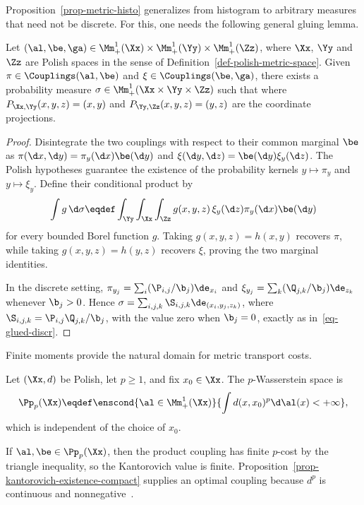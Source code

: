 Proposition~\ref{prop-metric-histo} generalizes from histogram to arbitrary measures that need not be discrete. For this, one needs the following general gluing lemma.

\begin{lem}\label{lem-gluing-general}
		Let $(\al,\be,\ga) \in \Mm_+^1(\Xx) \times \Mm_+^1(\Yy) \times \Mm_+^1(\Zz)$, where $\Xx$, $\Yy$ and $\Zz$ are Polish spaces in the sense of Definition~\ref{def-polish-metric-space}.
		Given $\pi \in \Couplings(\al,\be)$ and $\xi \in \Couplings(\be,\ga)$, there exists a probability measure
		$\sigma \in \Mm_+^1(\Xx \times \Yy \times \Zz)$ such that
		where $P_{\Xx,\Yy}(x,y,z)=(x,y)$ and $P_{\Yy,\Zz}(x,y,z)=(y,z)$ are the coordinate projections.
\end{lem}
\begin{proof}
		Disintegrate the two couplings with respect to their common marginal $\be$ as
		$\pi(\d x,\d y)=\pi_y(\d x)\be(\d y)$ and
		$\xi(\d y,\d z)=\be(\d y)\xi_y(\d z)$.
		The Polish hypotheses guarantee the existence of the probability kernels $y\mapsto\pi_y$ and $y\mapsto\xi_y$. Define their conditional product by
		\[
			\int g\,\d\sigma
			\eqdef
			\int_\Yy\int_\Xx\int_\Zz
			g(x,y,z)\,\xi_y(\d z)\pi_y(\d x)\be(\d y)
		\]
		for every bounded Borel function $g$. Taking $g(x,y,z)=h(x,y)$ recovers $\pi$, while taking $g(x,y,z)=h(y,z)$ recovers $\xi$, proving the two marginal identities.

		In the discrete setting, $\pi_{y_j}=\sum_i(\P_{i,j}/\b_j)\de_{x_i}$ and $\xi_{y_j}=\sum_k(\Q_{j,k}/\b_j)\de_{z_k}$ whenever $\b_j>0$. Hence
		$\sigma=\sum_{i,j,k}\S_{i,j,k}\de_{(x_i,y_j,z_k)}$, where
		$\S_{i,j,k}=\P_{i,j}\Q_{j,k}/\b_j$, with the value zero when $\b_j=0$,
		exactly as in~\eqref{eq-glued-discr}.
\end{proof}

Finite moments provide the natural domain for metric transport costs.
\begin{defn}\label{def-p-wasserstein-space}
Let $(\Xx,d)$ be Polish, let $p\geq1$, and fix $x_0\in\Xx$. The $p$-Wasserstein space is
\[
	\Pp_p(\Xx)
	\eqdef
	\enscond{\al\in\Mm_+^1(\Xx)}{\int d(x,x_0)^p\d\al(x)<+\infty},
\]
which is independent of the choice of $x_0$.
\end{defn}
If $\al,\be\in\Pp_p(\Xx)$, then the product coupling has finite $p$-cost by the triangle inequality, so the Kantorovich value is finite. Proposition~\ref{prop-kantorovich-existence-compact} supplies an optimal coupling because $d^p$ is continuous and nonnegative~\cite{Villani09,SantambrogioBook}.

